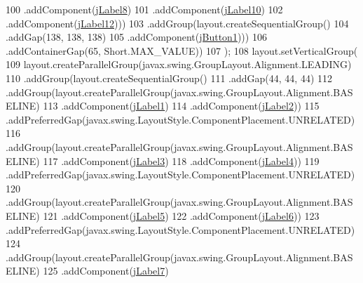 \begin{DoxyCode}
100                             .addComponent(\mbox{\hyperlink{class_interfaz_package_1_1_consulta_libro_afc512066b447316ce167de196273232f}{jLabel8}})
101                             .addComponent(\mbox{\hyperlink{class_interfaz_package_1_1_consulta_libro_aa72af154332185cfbed0dec73bd34450}{jLabel10}})
102                             .addComponent(\mbox{\hyperlink{class_interfaz_package_1_1_consulta_libro_a22c3d5f2c9bebc19190d3eb57195b720}{jLabel12}})))
103                     .addGroup(layout.createSequentialGroup()
104                         .addGap(138, 138, 138)
105                         .addComponent(\mbox{\hyperlink{class_interfaz_package_1_1_consulta_libro_a690d079d1efa9d0a7efd0cce09c7f375}{jButton1}})))
106                 .addContainerGap(65, Short.MAX\_VALUE))
107         );
108         layout.setVerticalGroup(
109             layout.createParallelGroup(javax.swing.GroupLayout.Alignment.LEADING)
110             .addGroup(layout.createSequentialGroup()
111                 .addGap(44, 44, 44)
112                 .addGroup(layout.createParallelGroup(javax.swing.GroupLayout.Alignment.BASELINE)
113                     .addComponent(\mbox{\hyperlink{class_interfaz_package_1_1_consulta_libro_ac77c7946cb8103b592bd26c93868e6dc}{jLabel1}})
114                     .addComponent(\mbox{\hyperlink{class_interfaz_package_1_1_consulta_libro_af5b8586972d0b220d8fc909d2566798f}{jLabel2}}))
115                 .addPreferredGap(javax.swing.LayoutStyle.ComponentPlacement.UNRELATED)
116                 .addGroup(layout.createParallelGroup(javax.swing.GroupLayout.Alignment.BASELINE)
117                     .addComponent(\mbox{\hyperlink{class_interfaz_package_1_1_consulta_libro_a3e4a05b55099ee80351bac56cdc1734b}{jLabel3}})
118                     .addComponent(\mbox{\hyperlink{class_interfaz_package_1_1_consulta_libro_a38c193843e6fdef8523b06eb32530cde}{jLabel4}}))
119                 .addPreferredGap(javax.swing.LayoutStyle.ComponentPlacement.UNRELATED)
120                 .addGroup(layout.createParallelGroup(javax.swing.GroupLayout.Alignment.BASELINE)
121                     .addComponent(\mbox{\hyperlink{class_interfaz_package_1_1_consulta_libro_a49a4d4fb7a30f3fa6d4fe697b5bace17}{jLabel5}})
122                     .addComponent(\mbox{\hyperlink{class_interfaz_package_1_1_consulta_libro_aa7ab64f2b86ab31bd150020068712678}{jLabel6}}))
123                 .addPreferredGap(javax.swing.LayoutStyle.ComponentPlacement.UNRELATED)
124                 .addGroup(layout.createParallelGroup(javax.swing.GroupLayout.Alignment.BASELINE)
125                     .addComponent(\mbox{\hyperlink{class_interfaz_package_1_1_consulta_libro_a218a7656528bb232eab4f384fed1254e}{jLabel7}})

\end{DoxyCode}
